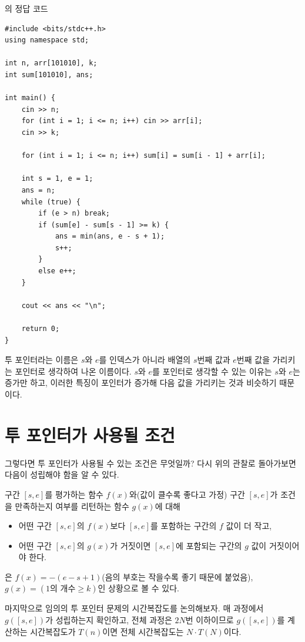 \begin{code} \label{code: two-pointer}
의 정답 코드
\begin{lstlisting}
#include <bits/stdc++.h>
using namespace std;

int n, arr[101010], k;
int sum[101010], ans;

int main() {
    cin >> n;
    for (int i = 1; i <= n; i++) cin >> arr[i];
    cin >> k;

    for (int i = 1; i <= n; i++) sum[i] = sum[i - 1] + arr[i];

    int s = 1, e = 1;
    ans = n;
    while (true) {
        if (e > n) break;
        if (sum[e] - sum[s - 1] >= k) {
            ans = min(ans, e - s + 1);
            s++;
        }
        else e++;
    }

    cout << ans << "\n";

    return 0;
}
\end{lstlisting}
\end{code}

투 포인터라는 이름은 $s$와 $e$를 인덱스가 아니라 배열의 $s$번째 값과 $e$번째 값을 가리키는 포인터로 생각하여 나온 이름이다. $s$와 $e$를 포인터로 생각할 수 있는 이유는 $s$와 $e$는 증가만 하고, 이러한 특징이 포인터가 증가해 다음 값을 가리키는 것과 비슷하기 때문이다.

\section{투 포인터가 사용될 조건}
그렇다면 투 포인터가 사용될 수 있는 조건은 무엇일까? 다시 위의 관찰로 돌아가보면 다음이 성립해야 함을 알 수 있다.
\begin{obs}
    구간 $[s, e]$를 평가하는 함수 $f(x)$와(값이 클수록 좋다고 가정) 구간 $[s, e]$가 조건을 만족하는지 여부를 리턴하는 함수 $g(x)$에 대해
    \begin{itemize}
        \item 어떤 구간 $[s, e]$의 $f(x)$보다 $[s, e]$를 포함하는 구간의 $f$ 값이 더 작고,
        \item 어떤 구간 $[s, e]$의 $g(x)$가 거짓이면 $[s, e]$에 포함되는 구간의 $g$ 값이 거짓이어야 한다.
    \end{itemize}
\end{obs}

은 $f(x) = -(e - s + 1)$(음의 부호는 작을수록 좋기 때문에 붙었음), $g(x)=(1\textrm{의 개수} \geq k)$인 상황으로 볼 수 있다.

마지막으로 임의의 투 포인터 문제의 시간복잡도를 논의해보자. 매 과정에서 $g([s, e])$가 성립하는지 확인하고, 전체 과정은 $2N$번 이하이므로 $g([s, e])$를 계산하는 시간복잡도가 $T(n)$이면 전체 시간복잡도는 $N \cdot T(N)$이다.

